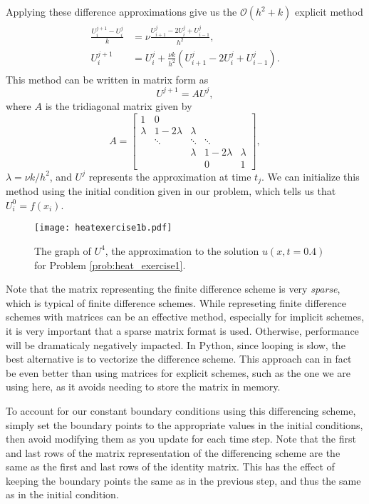 \noindent
Applying these difference approximations give us the $\mathcal{O}(h^2 + k)$ explicit method
\begin{align}
	\begin{split}
	\frac{U_{i}^{j+1} - U_{i}^{j}}{k} &= \nu \frac{U_{i+1}^{j}- 2U_{i}^{j} + U_{i-1}^{j} }{h^2} ,\\
	U_{i}^{j+1} &= U_{i}^{j} + \frac{\nu k}{h^2} (U_{i+1}^{j}- 2U_{i}^{j} + U_{i-1}^{j} ).
	\end{split}\label{eqn:firstorder_explicit}
\end{align}
This method can be written in matrix form as
\[U^{j+1} = A U^j,\]
where $A$ is the tridiagonal matrix given by
\[A = \left[\begin{array}{cccccc}1 & 0 & & & \\ \lambda & 1-2\lambda & \lambda & & \\ & \ddots & \ddots & \ddots & \\ & & \lambda & 1-2\lambda & \lambda \\  &  &  & 0 & 1\end{array}\right],\]
$\lambda = \nu k/h^2$, and $U^j$ represents the approximation at time $t_j$.
We can initialize this method using the initial condition given in our problem, which tells us that $U_{i}^{0} = f(x_i)$.

\begin{figure}
\centering
\texttt{[image: heatexercise1b.pdf]}
\caption{The graph of $U^{4}$, the approximation to the solution $u(x,t=0.4)$ for Problem \ref{prob:heat_exercise1}.}
\label{fig:heatexercise1b}
\end{figure}

\begin{info}
Note that the matrix representing the finite difference scheme is very \emph{sparse}, which is typical of finite difference schemes.
While represeting finite difference schemes with matrices can be an effective method, especially for implicit schemes, it is very important that a sparse matrix format is used.
Otherwise, performance will be dramaticaly negatively impacted.
In Python, since looping is slow, the best alternative is to vectorize the difference scheme.
This approach can in fact be even better than using matrices for explicit schemes, such as the one we are using here, as it avoids needing to store the matrix in memory.
\end{info}

To account for our constant boundary conditions using this differencing scheme, simply set the boundary points to the appropriate values in the initial conditions, then avoid modifying them as you update for each time step.
Note that the first and last rows of the matrix representation of the differencing scheme are the same as the first and last rows of the identity matrix.
This has the effect of keeping the boundary points the same as in the previous step, and thus the same as in the initial condition.

